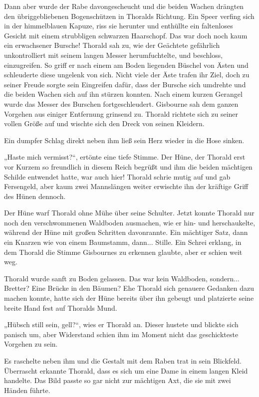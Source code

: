 \documentclass[10pt, a4paper, oneside]{book}
\begin{document}
Dann aber wurde der Rabe davongescheucht und die beiden Wachen drängten den übriggebliebenen Bogenschützen in Thoralds Richtung. Ein Speer verfing sich in der himmelblauen Kapuze, riss sie herunter und enthüllte ein faltenloses Gesicht mit einem strubbligen schwarzen Haarschopf. Das war doch noch kaum ein erwachsener Bursche! Thorald sah zu, wie der Geächtete gefährlich unkontrolliert mit seinem langen Messer herumfuchtelte, und beschloss, einzugreifen. So griff er nach einem am Boden liegenden Büschel von Ästen und schleuderte diese ungelenk von sich. Nicht viele der Äste trafen ihr Ziel, doch zu seiner Freude sorgte sein Eingreifen dafür, dass der Bursche sich umdrehte und die beiden Wachen sich auf ihn stürzen konnten. Nach einem kurzen Gerangel wurde das Messer des Burschen fortgeschleudert. Gisbourne sah dem ganzen Vorgehen aus einiger Entfernung grinsend zu. Thorald richtete sich zu seiner vollen Größe auf und wischte sich den Dreck von seinen Kleidern.

Ein dumpfer Schlag direkt neben ihm ließ sein Herz wieder in die Hose sinken.

„Haste mich vermisst?“, ertönte eine tiefe Stimme. Der Hüne, der Thorald erst vor Kurzem so freundlich in diesem Reich begrüßt und ihm die beiden mächtigen Schilde entwendet hatte, war auch hier! Thorald schrie mutig auf und gab Fersengeld, aber kaum zwei Mannslängen weiter erwischte ihn der kräftige Griff des Hünen dennoch.

Der Hüne warf Thorald ohne Mühe über seine Schulter. Jetzt konnte Thorald nur noch den verschwommenen Waldboden ausmachen, wie er hin- und herschaukelte, während der Hüne mit großen Schritten davonrannte. Ein mächtiger Satz, dann ein Knarzen wie von einem Baumstamm, dann... Stille. Ein Schrei erklang, in dem Thorald die Stimme Gisbournes zu erkennen glaubte, aber er schien weit weg.\bigskip







Thorald wurde sanft zu Boden gelassen. Das war kein Waldboden, sondern... Bretter? Eine Brücke in den Bäumen? Ehe Thorald sich genauere Gedanken dazu machen konnte, hatte sich der Hüne bereits über ihn gebeugt und platzierte seine breite Hand fest auf Thoralds Mund.

„Hübsch still sein, gell?“, wies er Thorald an. Dieser hustete und blickte sich panisch um, aber Widerstand schien ihm im Moment nicht das geschickteste Vorgehen zu sein.

Es raschelte neben ihm und die Gestalt mit dem Raben trat in sein Blickfeld. Überrascht erkannte Thorald, dass es sich um eine Dame in einem langen Kleid handelte. Das Bild passte so gar nicht zur mächtigen Axt, die sie mit zwei Händen führte.
\end{document}
